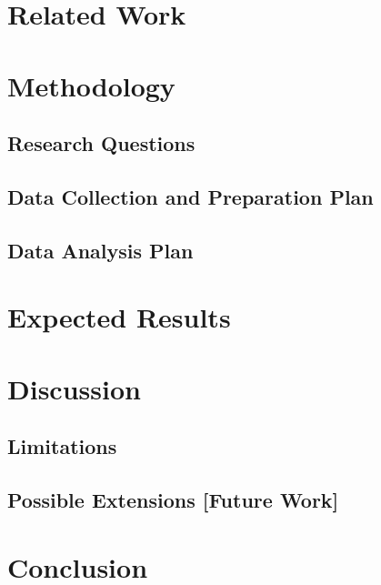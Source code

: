 \documentclass[conference]{IEEEtran}
\begin{document}
\section{Related Work}

\section{Methodology}

\subsection{Research Questions}
\subsection{Data Collection and Preparation Plan}
\subsection{Data Analysis Plan}


\section{Expected Results}
\section{Discussion}
\subsection{Limitations}
\subsection{Possible Extensions [Future Work]}
\section{Conclusion}
\end{document}
